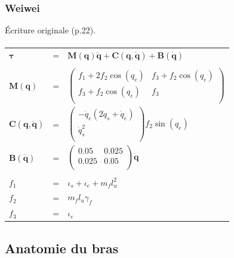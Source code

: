 \documentclass[pdftex,a4paper,11pt]{article}
\newcommand{\vs}[1]{\boldsymbol{#1}} %
\newcommand{\ms}[1]{\boldsymbol{#1}} %
\numberwithin{equation}{subsection}
\begin{document}

\subsubsection{Weiwei}
Écriture originale \cite{li2006} (p.22).

\paragraph{}
\begin{tabular}{lcl}
    $\vs{\tau}$ & = & $\ms{M}(\vs{q})\vs{\ddot{q}} + \vs{C}(\vs{q}, \vs{\dot{q}}) + \vs{B}(\vs{\dot{q}})$ \\
    \\

    $\ms{M}(\vs{q})$ & = &
    $
    \begin{pmatrix}
        f_1 + 2 f_2 \cos(q_e)  & f_3 + f_2 \cos(q_e) \\
        f_3 + f_2 \cos(q_e) & f_3 \\
    \end{pmatrix}
    $ \\

    $\vs{C}(\vs{q}, \vs{\dot{q}})$ & = &
    $
    \begin{pmatrix}
        -\dot{q}_e (2 \dot{q}_s + \dot{q}_e) \\
        \dot{q}_s^2 \\
    \end{pmatrix}
    f_2 \sin(q_e)
    $\\

    $\vs{B}(\vs{\dot{q}})$ & = &
    $
    \begin{pmatrix}
        0.05  & 0.025 \\
        0.025 & 0.05 \\
    \end{pmatrix}
    \vs{\dot{q}}
    $ \\
    \\

    $f_1$ & = & $\iota_s + \iota_e + m_f l_u^2$ \\
    $f_2$ & = & $m_f l_u \gamma_f$ \\
    $f_3$ & = & $\iota_e$ \\
\end{tabular}


\subsection{Anatomie du bras}
\end{document}
